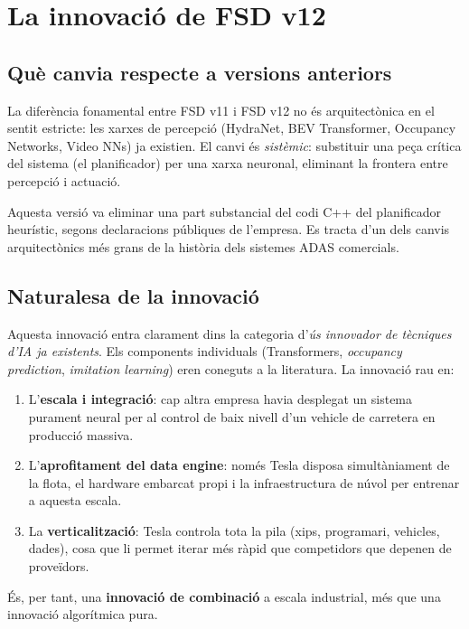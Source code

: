 \documentclass[11pt,a4paper]{article}
\begin{document}
\section{La innovació de FSD v12}

\subsection{Què canvia respecte a versions anteriors}

La diferència fonamental entre FSD v11 i FSD v12 no és arquitectònica en el sentit estricte: les xarxes de percepció (HydraNet, BEV Transformer, Occupancy Networks, Video NNs) ja existien. El canvi és \emph{sistèmic}: substituir una peça crítica del sistema (el planificador) per una xarxa neuronal, eliminant la frontera entre percepció i actuació.

Aquesta versió va eliminar una part substancial del codi C++ del planificador heurístic, segons declaracions públiques de l'empresa. Es tracta d'un dels canvis arquitectònics més grans de la història dels sistemes ADAS comercials.

\subsection{Naturalesa de la innovació}

Aquesta innovació entra clarament dins la categoria d'\emph{ús innovador de tècniques d'IA ja existents}. Els components individuals (Transformers, \emph{occupancy prediction}, \emph{imitation learning}) eren coneguts a la literatura. La innovació rau en:

\begin{enumerate}[leftmargin=*]
    \item L'\textbf{escala i integració}: cap altra empresa havia desplegat un sistema purament neural per al control de baix nivell d'un vehicle de carretera en producció massiva.
    \item L'\textbf{aprofitament del data engine}: només Tesla disposa simultàniament de la flota, el hardware embarcat propi i la infraestructura de núvol per entrenar a aquesta escala.
    \item La \textbf{verticalització}: Tesla controla tota la pila (xips, programari, vehicles, dades), cosa que li permet iterar més ràpid que competidors que depenen de proveïdors.
\end{enumerate}

És, per tant, una \textbf{innovació de combinació} a escala industrial, més que una innovació algorítmica pura.
\end{document}
